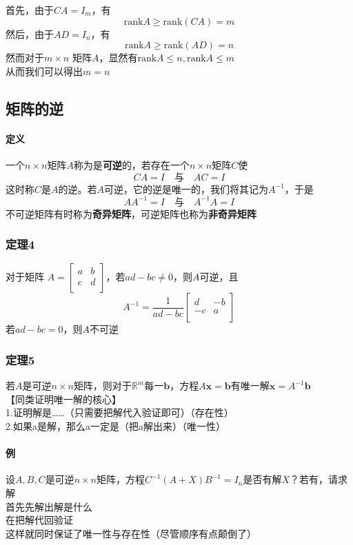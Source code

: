 \documentclass{article}
\newcommand{\ve}{\boldsymbol}
\begin{document}
\begin{CJK}{UTF8}{gkai}
首先，由于$CA= I_m$，有
\[\text{rank} A \geq \text{rank}(CA) = m\] 
然后，由于$AD= I_n$，有
\[\text{rank} A \geq \text{rank}(AD) = n\] 
然而对于$m\times n$ 矩阵$A$，显然有$\text{rank} A \leq n, \text{rank} A \leq m$\\

从而我们可以得出$m = n$

\subsection{矩阵的逆}
\paragraph{定义\\}
一个$n\times n$矩阵$A$称为是\textbf{可逆}的，若存在一个$n\times n$矩阵$C$使
\[CA=I\quad \text{与} \quad AC=I\]
这时称$C$是$A$的逆。若$A$可逆，它的逆是唯一的，我们将其记为$A^{-1}$，于是\\
\[AA^{-1}=I\quad \text{与}\quad A^{-1}A=I\]
不可逆矩阵有时称为\textbf{奇异矩阵}，可逆矩阵也称为\textbf{非奇异矩阵}\\

\subsubsection{定理4}
对于矩阵
$A=\begin{bmatrix}
    a&b\\
    c&d\\  
\end{bmatrix}$，若$ad-bc\neq 0$，则$A$可逆，且
\[A^{-1}=\dfrac{1}{ad-bc}
\begin{bmatrix}
    d&-b\\
    -c&a\\
\end{bmatrix}    \]
若$ad-bc=0$，则$A$不可逆\\
\subsubsection{定理5}
若$A$是可逆$n\times n$矩阵，则对于$\mathbb{R}^m$每一$\ve{b}$，方程$A\ve{x}=\ve{b}$有唯一解$\ve{x}=A^{-1}\ve{b}$\\
【同类证明唯一解的核心】\\
1.证明解是……（只需要把解代入验证即可）（存在性）\\
2.如果a是解，那么a一定是（把a解出来）（唯一性）\\
\paragraph{例\\}
设$A,B,C$是可逆$n\times n$矩阵，方程$C^{-1} (A+X)B^{-1}=I_n$是否有解$X$？若有，请求解\\
首先先解出解是什么\\
在把解代回验证\\
这样就同时保证了唯一性与存在性（尽管顺序有点颠倒了）\\

\end{CJK}
\end{document}
